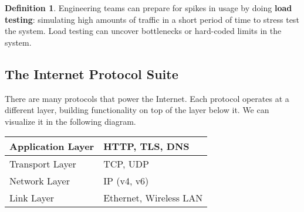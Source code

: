 \documentclass[a4paper, 12pt]{report}
\theoremstyle{remark}
\theoremstyle{definition}
\newtheorem{definition}{Definition}[section]
\begin{document}
\begin{definition}
Engineering teams can prepare for spikes in usage by doing \textbf{load testing}: simulating high amounts of traffic in a short period of time to stress test the system. Load testing can uncover bottlenecks or hard-coded limits in the system. 
\end{definition}

\subsection{The Internet Protocol Suite}
There are many protocols that power the Internet. Each protocol operates at a different layer, building functionality on top of the layer below it. We can visualize it in the following diagram. 
\begin{center}
\begin{tabular}{l|l}
    Application Layer & HTTP, TLS, DNS\\
    \hline
    Transport Layer & TCP, UDP \\
    \hline
    Network Layer & IP (v4, v6) \\
    \hline
    Link Layer & Ethernet, Wireless LAN
\end{tabular}
\end{center}
\end{document}
